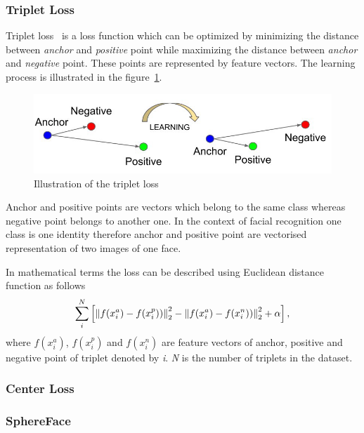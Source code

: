 \subsubsection{Triplet Loss}\label{subsubsec:triplet-loss}
Triplet loss~\cite{TripletLoss} is a loss function which can be optimized by minimizing the distance between
\textit{anchor} and \textit{positive} point while maximizing the distance between \textit{anchor} and \textit{negative}
point.
These points are represented by feature vectors.
The learning process is illustrated in the figure~\ref{fig:tripletloss}.

\begin{figure}[H]
    \centering
    \includegraphics[width=\columnwidth]{images/face-recognition/tripletloss.jpeg}
    \caption{Illustration of the triplet loss~\cite{TripletLoss}}
    \label{fig:tripletloss}
\end{figure}

Anchor and positive points are vectors which belong to the same class whereas negative point belongs to another one.
In the context of facial recognition one class is one identity therefore anchor and positive point are vectorised
representation of two images of one face.

In mathematical terms the loss can be described using Euclidean distance function as follows
\begin{equation}
    \sum_{i}^{N} \left[ \left\lVert f(x_{i}^{a}) - f(x_{i}^{p}))\right\rVert^2_2
    - \left\lVert f(x_{i}^{a}) - f(x_{i}^{n}))\right\rVert^2_2 + \alpha \right],
\end{equation}
where $f(x_{i}^{a})$, $f(x_{i}^{p})$ and $f(x_{i}^{n})$ are feature vectors of anchor, positive and
negative point of triplet denoted by \textit{i}.
\textit{N} is the number of triplets in the dataset.

\subsubsection{Center Loss}

\subsubsection{SphereFace}


